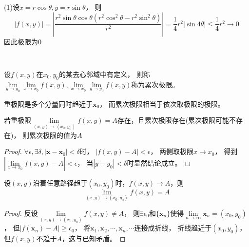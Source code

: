 \begin{solution}
  (1)设$x = r \cos \theta, y = r \sin \theta$，
  则
  \begin{equation*}
   |f(x,y)| = \left|\frac{r^2 \sin \theta \cos \theta (r^2\cos ^2\theta - r^2\sin^2 \theta)}{r^2}\right| =  \frac{1}{4}r^2 \left| \sin 4\theta \right| \leq \frac{1}{4}r^2\rightarrow 0
  \end{equation*}
  因此极限为$0$
\end{solution}


~


\begin{definition}[累次极限]
  设$f(x,y)$在$x_0,y_0$的某去心邻域中有定义，
  则称$\lim \limits _{y \rightarrow y_0}\lim \limits _{x \rightarrow x_0} f(x,y), \lim \limits _{x \rightarrow x_0} \lim \limits _{y \rightarrow y_0}f(x,y)$称为累次极限。
\end{definition}

\begin{note}
  重极限是多个分量同时趋近于$\mathbf{x}_0$，
  而累次极限相当于依次取极限的极限。
\end{note}

\begin{theorem}[重极限与累次极限的关系]
  若重极限$\lim \limits _{(x,y) \rightarrow (x_0,y_0)}f(x,y) = A$存在，且累次极限存在(累次极限可能不存在)，
  则累次极限的值为$A$
\end{theorem}

\begin{proof}
  $\forall \epsilon, \exists \delta, |\mathbf{x} - \mathbf{x}_0| < \delta$时，
  $|f(x,y) - A| < \epsilon$，
  两侧取极限$x \rightarrow x_0$，
  得到$|\lim \limits _{x \rightarrow x_0}f(x,y) - A| < \epsilon$，
  当$|y - y_0| < \delta$时显然结论成立。
\end{proof}

\begin{theorem}[重极限的任意性]
  设$(x,y)$沿着任意路径趋于$(x_0,y_0)$时，$f(x,y) \rightarrow A$，则
  \begin{equation*}
    \lim \limits _{(x,y) \rightarrow (x_0,y_0)} f(x,y) = A
  \end{equation*}
\end{theorem}

\begin{proof}
  反设$\lim \limits _{(x,y) \rightarrow (x_0,y_0)}f(x,y) \neq A$，
  则$\exists \epsilon_0$和$\{\mathbf{x}_n\}$使得$\lim \limits _{n \rightarrow \infty} \mathbf{x}_n = (x_0,y_0)$，
  但$|f(\mathbf{x}_n) - A| \geq \epsilon_0$，
  将$\mathbf{x}_1,\mathbf{x}_2,\cdots,\mathbf{x}_n,\cdots$连接成折线，
  折线趋近于$(x_0,y_0)$，但$f(x,y)$不趋于$A$，这与已知矛盾。
\end{proof}


